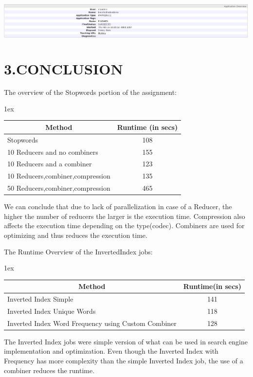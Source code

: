 \documentclass{article}
\begin{document}
\includegraphics[keepaspectratio=true,width=\dimmin{}{\dimwidth{1.30}}]{images/iifreq}{}%

\section{3.\hspace*{0.5em}CONCLUSION}\label{heading}%

\noindent The overview of the Stopwords portion of the assignment:%
\begin{mdtabular}{2}{}{1ex}%
\begin{tabular}{lc}\midrule
\multicolumn{1}{|c}{{\bfseries Method}}&\multicolumn{1}{c|}{{\bfseries Runtime (in secs)}}\\

\midrule
\multicolumn{1}{|l}{Stopwords}&\multicolumn{1}{c|}{108}\\
\multicolumn{1}{|l}{10 Reducers and no combiners}&\multicolumn{1}{c|}{155}\\
\multicolumn{1}{|l}{10 Reducers and a combiner}&\multicolumn{1}{c|}{123}\\
\multicolumn{1}{|l}{10 Reducers,combiner,compression}&\multicolumn{1}{c|}{135}\\
\multicolumn{1}{|l}{50 Reducers,combiner,compression}&\multicolumn{1}{c|}{465}\\
\midrule
\end{tabular}\end{mdtabular}

\noindent We can conclude that due to lack of parallelization in case of a Reducer, the higher the number of reducers the larger is the
execution time. Compression also affects the execution time depending on the type(codec). Combiners are used for optimizing and thus reduces the execution time.%

The Runtime Overview of the InvertedIndex jobs:%
\begin{mdtabular}{2}{}{1ex}%
\begin{tabular}{lc}\midrule
\multicolumn{1}{|c}{{\bfseries Method}}&\multicolumn{1}{c|}{{\bfseries Runtime(in secs)}}\\

\midrule
\multicolumn{1}{|l}{Inverted Index Simple}&\multicolumn{1}{c|}{141}\\
\multicolumn{1}{|l}{Inverted Index Unique Words}&\multicolumn{1}{c|}{118}\\
\multicolumn{1}{|l}{Inverted Index Word Frequency using Custom Combiner}&\multicolumn{1}{c|}{128}\\
\midrule
\end{tabular}\end{mdtabular}

\noindent The Inverted Index jobs were simple version of what can be used in search engine implementation and optimization. Even though 
the Inverted Index with Frequency has more complexity than the simple Inverted Index job, the use of a combiner reduces the runtime.%
\end{document}
